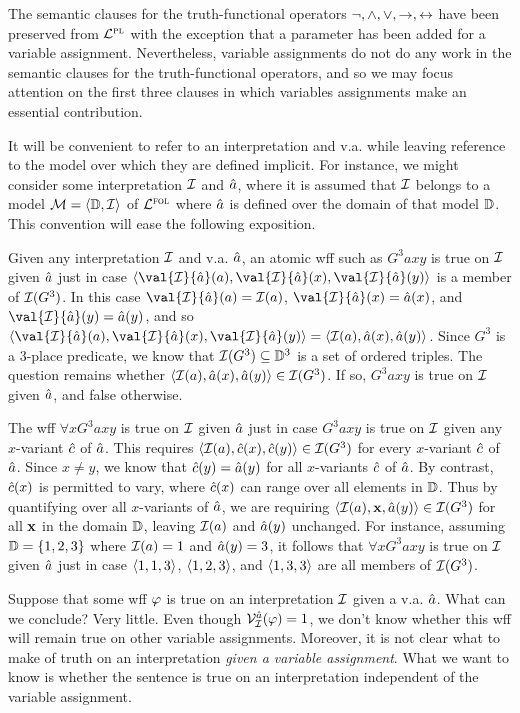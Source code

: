 The semantic clauses for the truth-functional operators $\neg,\wedge,\vee,\rightarrow,\leftrightarrow$ have been preserved from $\mathcal{L}^{\textsc{pl}}$ with the exception that a parameter has been added for a variable assignment. 
Nevertheless, variable assignments do not do any work in the semantic clauses for the truth-functional operators, and so we may focus attention on the first three clauses in which variables assignments make an essential contribution.

It will be convenient to refer to an interpretation and v.a. while leaving reference to the model over which they are defined implicit.
For instance, we might consider some interpretation $\mathcal{I}$ and $\hat{a}$, where it is assumed that $\mathcal{I}$ belongs to a model $\mathcal{M} = \langle\mathbb{D}, \mathcal{I}\rangle$ of $\mathcal{L}^{\textsc{fol}}$ where $\hat{a}$ is defined over the domain of that model $\mathbb{D}$.
This convention will ease the following exposition.

Given any interpretation $\mathcal{I}$ and v.a. $\hat{a}$, an atomic wff such as $G^3axy$ is true on $\mathcal{I}$ given $\hat{a}$ just in case $\tuple{\val{\I}{\va{a}}(a),\val{\I}{\va{a}}(x),\val{\I}{\va{a}}(y)}$ is a member of $\mathcal{I}(G^3)$.
In this case $\val{\I}{\va{a}}(a)=\I(a)$, $\val{\I}{\va{a}}(x)=\va{a}(x)$, and $\val{\I}{\va{a}}(y)=\va{a}(y)$, and so $\tuple{\val{\I}{\va{a}}(a), \val{\I}{\va{a}}(x), \val{\I}{\va{a}}(y)}=\tuple{\I(a),\va{a}(x),\va{a}(y)}$. 
Since $G^3$ is a $3$-place predicate, we know that $\mathcal{I}(G^3)\subseteq \mathbb{D}^3$ is a set of ordered triples. 
The question remains whether $\langle\mathcal{I}(a),\hat{a}(x),\hat{a}(y)\rangle\in\mathcal{I}(G^3)$.
If so, $G^3axy$ is true on $\mathcal{I}$ given $\hat{a}$, and false otherwise.

The wff $\forall xG^3axy$ is true on $\mathcal{I}$ given $\hat{a}$ just in case $G^3axy$ is true on $\mathcal{I}$ given any $x$-variant $\hat{c}$ of $\hat{a}$.
This requires $\langle\mathcal{I}(a),\hat{c}(x),\hat{c}(y)\rangle\in\mathcal{I}(G^3)$ for every $x$-variant $\hat{c}$ of $\hat{a}$.
Since $x\neq y$, we know that $\hat{c}(y)=\hat{a}(y)$ for all $x$-variants $\hat{c}$ of $\hat{a}$.
By contrast, $\hat{c}(x)$ is permitted to vary, where $\hat{c}(x)$ can range over all elements in $\mathbb{D}$.
Thus by quantifying over all $x$-variants of $\hat{a}$, we are requiring $\langle\mathcal{I}(a),\mathbf{x},\hat{a}(y)\rangle\in\mathcal{I}(G^3)$ for all $\mathbf{x}$ in the domain $\mathbb{D}$, leaving $\mathcal{I}(a)$ and $\hat{a}(y)$ unchanged.
For instance, assuming $\mathbb{D}=\lbrace1,2,3\rbrace$ where $\mathcal{I}(a)=1$ and $\hat{a}(y)=3$, it follows that $\forall xG^3axy$ is true on $\mathcal{I}$ given $\hat{a}$ just in case $\langle1,1,3\rangle$, $\langle1,2,3\rangle$, and $\langle1,3,3\rangle$ are all members of $\mathcal{I}(G^3)$.

Suppose that some wff $\varphi$ is true on an interpretation $\mathcal{I}$ given a v.a. $\hat{a}$.
What can we conclude?
Very little.
Even though $\mathcal{V}_{\mathcal{I}}^{\hat{a}}(\varphi)=1$, we don't know whether this wff will remain true on other variable assignments.
Moreover, it is not clear what to make of truth on an interpretation \textit{given a variable assignment}.
What we want to know is whether the sentence is true on an interpretation independent of the variable assignment.

